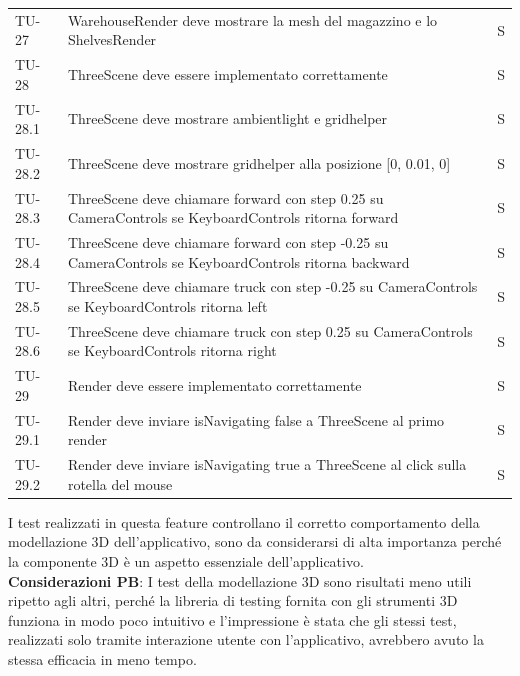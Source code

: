 \begin{xltabular}{0.9\textwidth}{X | p{0.6\textwidth} | p{0.1\textwidth} }
    TU-27 & WarehouseRender deve mostrare la mesh del magazzino e lo ShelvesRender & S\\

    TU-28 & ThreeScene deve essere implementato correttamente & S\\
    TU-28.1 & ThreeScene deve mostrare ambientlight e gridhelper & S\\
    TU-28.2 & ThreeScene deve mostrare gridhelper alla posizione [0, 0.01, 0] & S\\
    TU-28.3 & ThreeScene deve chiamare forward con step 0.25 su CameraControls se KeyboardControls ritorna forward & S\\
    TU-28.4 & ThreeScene deve chiamare forward con step -0.25 su CameraControls se KeyboardControls ritorna backward & S\\
    TU-28.5 & ThreeScene deve chiamare truck con step -0.25 su CameraControls se KeyboardControls ritorna left & S\\
    TU-28.6 & ThreeScene deve chiamare truck con step 0.25 su CameraControls se KeyboardControls ritorna right & S\\

    TU-29 & Render deve essere implementato correttamente & S\\
    TU-29.1 & Render deve inviare isNavigating false a ThreeScene al primo render & S\\
    TU-29.2 & Render deve inviare isNavigating true a ThreeScene al click sulla rotella del mouse & S\\

\end{xltabular}

\noindent I test realizzati in questa feature controllano il corretto comportamento della modellazione 3D dell'applicativo, sono da considerarsi di alta importanza perché la componente 3D è un aspetto essenziale dell'applicativo.
\vspace{0.2cm} \\ \textbf{Considerazioni PB}: I test della modellazione 3D sono risultati meno utili ripetto agli altri, perché la libreria di testing fornita con gli strumenti 3D funziona in modo poco intuitivo e l'impressione è stata che gli stessi test, realizzati solo tramite interazione utente con l'applicativo, avrebbero avuto la stessa efficacia in meno tempo.    


